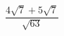 \begin{ex}[type=calculate]
	\begin{condition}
		\( \dfrac{4\sqrt{7}+5\sqrt{7}}{\sqrt{63}} \)
	\end{condition}
\end{ex}